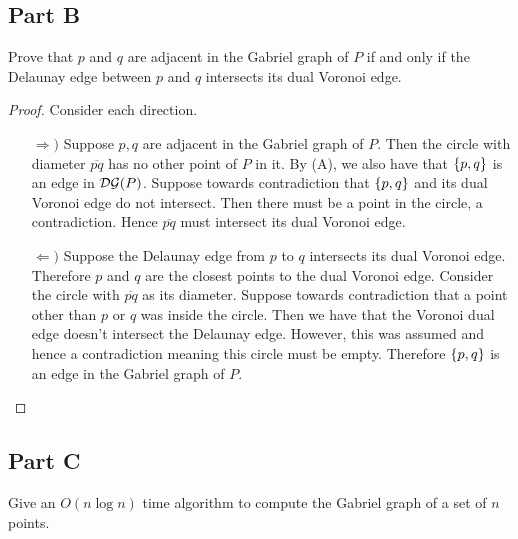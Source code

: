 \documentclass[12pt]{extarticle}
\begin{document}
\subsection*{Part B}
Prove that $p$ and $q$ are adjacent in the Gabriel graph of $P$ if and only if the Delaunay edge between $p$ and $q$ intersects its dual Voronoi edge.

\begin{proof}
    Consider each direction.
    \begin{enumerate}
        \item[$\Rightarrow)$]
            Suppose $p,q$ are adjacent in the Gabriel graph of $P$. Then the circle with diameter $\overline{pq}$ has no other point of $P$ in it. By (A), we also have that $\qty{p,q}$ is an edge in $\mathcal{DG}(P)$. Suppose towards contradiction that $\qty{p,q}$ and its dual Voronoi edge do not intersect. Then there must be a point in the circle, a contradiction. Hence $\overline{pq}$ must intersect its dual Voronoi edge.
        \item[$\Leftarrow)$]
            Suppose the Delaunay edge from $p$ to $q$ intersects its dual Voronoi edge. Therefore $p$ and $q$ are the closest points to the dual Voronoi edge. Consider the circle with $\overline{pq}$ as its diameter. Suppose towards contradiction that a point other than $p$ or $q$ was inside the circle. Then we have that the Voronoi dual edge doesn't intersect the Delaunay edge. However, this was assumed and hence a contradiction meaning this circle must be empty. Therefore $\qty{p,q}$ is an edge in the Gabriel graph of $P$.
    \end{enumerate}
\end{proof}

\subsection*{Part C}
Give an $O(n\log n)$ time algorithm to compute the Gabriel graph of a set of $n$ points.
\end{document}
